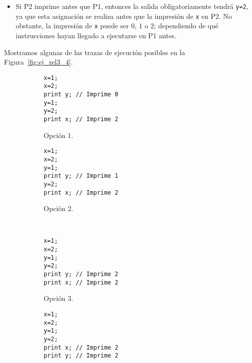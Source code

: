 \begin{ejercicio}
\begin{enumerate}
\begin{itemize}
            \item Si P2 imprime antes que P1, entonces la salida obligatoriamente tendrá \verb|y=2|, ya que esta asignación se realiza antes que la impresión de \verb|x| en P2.
            No obstante, la impresión de \verb|x| puede ser $0$, $1$ o $2$; dependiendo de qué instrucciones hayan llegado a ejecutarse en P1 antes.
        \end{itemize}
        
        Mostramos algunas de las trazas de ejecución posibles en la Figura~\ref{fig:ej_rel3_4}.
\begin{figure}
    \centering
    \begin{subfigure}{0.3\textwidth}
        \begin{verbatim}
x=1;
x=2;
print y; // Imprime 0
y=1;
y=2;
print x; // Imprime 2
        \end{verbatim}
        \caption{Opción 1.}
    \end{subfigure}\hspace{3cm}
    \begin{subfigure}{0.3\textwidth}
        \begin{verbatim}
x=1;
x=2;
y=1;
print y; // Imprime 1
y=2;
print x; // Imprime 2
        \end{verbatim}
        \caption{Opción 2.}            
    \end{subfigure}
    \\
    \begin{subfigure}{0.3\textwidth}
        \begin{verbatim}
x=1;
x=2;
y=1;
y=2;
print y; // Imprime 2
print x; // Imprime 2
        \end{verbatim}
        \caption{Opción 3.}
    \end{subfigure}\hspace{3cm}
    \begin{subfigure}{0.3\textwidth}
        \begin{verbatim}
x=1;
x=2;
y=1;
y=2;
print x; // Imprime 2
print y; // Imprime 2
        \end{verbatim}

\end{subfigure}
\end{figure}
\end{enumerate}
\end{ejercicio}
